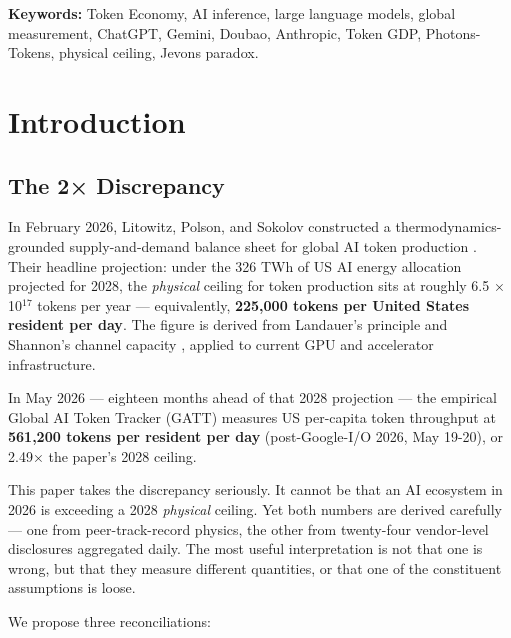 \documentclass[11pt,a4paper]{article}
\begin{document}
\textbf{Keywords:} Token Economy, AI inference, large language models, global measurement, ChatGPT, Gemini, Doubao, Anthropic, Token GDP, Photons-Tokens, physical ceiling, Jevons paradox.


\section{Introduction}

\subsection{The 2× Discrepancy}

In February 2026, Litowitz, Polson, and Sokolov constructed a thermodynamics-grounded supply-and-demand balance sheet for global AI token production \cite{litowitz2026photons}. Their headline projection: under the 326 TWh of US AI energy allocation projected for 2028, the \emph{physical} ceiling for token production sits at roughly 6.5 × 10$^{17}$ tokens per year --- equivalently, \textbf{225,000 tokens per United States resident per day}. The figure is derived from Landauer's principle \cite{landauer1961irreversibility} and Shannon's channel capacity \cite{shannon1948mathematical}, applied to current GPU and accelerator infrastructure.

In May 2026 --- eighteen months ahead of that 2028 projection --- the empirical Global AI Token Tracker (GATT) measures US per-capita token throughput at \textbf{561,200 tokens per resident per day} (post-Google-I/O 2026, May 19-20), or 2.49× the paper's 2028 ceiling.

This paper takes the discrepancy seriously. It cannot be that an AI ecosystem in 2026 is exceeding a 2028 \emph{physical} ceiling. Yet both numbers are derived carefully --- one from peer-track-record physics, the other from twenty-four vendor-level disclosures aggregated daily. The most useful interpretation is not that one is wrong, but that they measure different quantities, or that one of the constituent assumptions is loose.

We propose three reconciliations:
\end{document}
